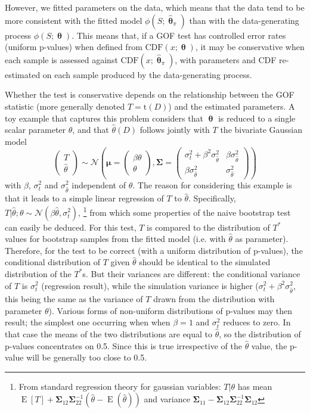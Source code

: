 \documentclass[a4paper]{article}\usepackage[]{graphicx}\usepackage[]{color}
\newcommand{\data}{\ensuremath{D}}
\newcommand{\CDF}{\ensuremath{\mathrm{CDF}}}
\newcommand{\tfn}{\ensuremath{\mathrm{t}}}
\newcommand{\bth}{\ensuremath{\bm{\uptheta}}}
\newcommand{\bSigma}{\ensuremath{\boldsymbol{\Sigma}}}
\DeclareMathOperator{\Esp}{E}
\begin{document}
However, we fitted parameters on the data, which means that the data tend to be more consistent with the fitted model $\phi(S;\hat{\bth}_\pi)$ than with the data-generating process $\phi(S; \bth)$. This means that, if a GOF test has controlled error rates (uniform p-values) when defined from $\CDF(x;\bth)$, it may be conservative when each sample is assessed against  $\CDF(x;\hat{\bth}_\pi)$, with parameters and CDF re-estimated on each sample produced by the data-generating process.

Whether the test is conservative depends on the relationship between the GOF statistic (more generally denoted $T=\tfn(D)$) and the estimated parameters. A toy example that captures this problem considers that $\bth$ is reduced to a single scalar parameter $\theta$, and that $\hat{\theta}(\data)$ follows jointly with $T$ the bivariate Gaussian model
\begin{equation*}
	\begin{pmatrix}T\\  \hat{\theta}\end{pmatrix} \sim \mathcal{N}\left(\boldsymbol{\mu}=\begin{pmatrix}\beta \theta\\ \theta\end{pmatrix}, \bSigma=\begin{pmatrix}
	\sigma^2_t+\beta^2 \sigma^2_{\hat{\theta}}& \beta \sigma^2_{\hat{\theta}}\\
	\beta \sigma^2_{\hat{\theta}}& \sigma^2_{\hat{\theta}}
	\end{pmatrix}\right)
\end{equation*}
with $\beta$, $\sigma^2_t$ and $\sigma^2_{\hat{\theta}}$ independent of $\theta$. The reason for considering this example is that it leads to a simple linear regression of $T$ to $\hat{\theta}$. Specifically, $T|\hat{\theta}; \theta \sim \mathcal{N}(\beta\hat{\theta},\sigma^2_t)$,%
%
\footnote[3]{From standard regression theory for gaussian variables: $T|\theta$ has mean $\Esp[T]+\bSigma_{12} \bSigma_{22}^{-1}(\hat{\theta}-\Esp(\hat{\theta}))$ and variance $\bSigma_{11}-\bSigma_{12} \bSigma_{22}^{-1}\bSigma_{12}$} %
%
from which some properties of the naive bootstrap test can easily be deduced. For this test, $T$ is compared to the distribution of $T^*$ values for bootstrap samples from the fitted model (i.e. with $\hat{\theta}$ as parameter). Therefore, for the test to be correct (with a uniform distribution of p-values), the conditional distribution of $T$ given $\hat{\theta}$ should be identical to the simulated distribution of the $T^*$s. But their variances are different: the conditional variance of $T$ is $\sigma^2_t$ (regression result), while the simulation variance is higher ($\sigma^2_t+\beta^2 \sigma^2_{\hat{\theta}}$, this being the same as the variance of $T$ drawn from the distribution with parameter $\theta$).  Various forms of non-uniform distributions of p-values may then result; the simplest one occurring when when $\beta=1$ and $\sigma^2_t$ reduces to zero. In that case the means of the two distributions are equal to $\hat{\theta}$, so the distribution of p-values concentrates on 0.5. Since this is true irrespective of the $\hat{\theta}$ value, the p-value will be generally too close to 0.5.
\end{document}
